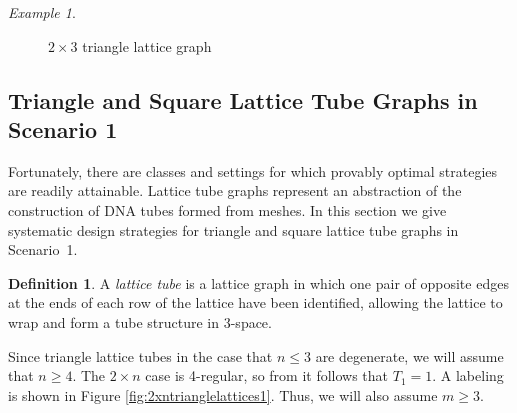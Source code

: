 \documentclass{elsarticle}
\theoremstyle{definition}
\newtheorem{definition}[theorem]{Definition}
\theoremstyle{remark}
\newtheorem{example}[theorem]{Example}
\theoremstyle{plain}
\theoremstyle{plain}
\begin{document}
\begin{example}
\begin{figure}[h]
 \caption{$2 \times 3$ triangle lattice graph}\label{TriangleNonIsoExample} \end{figure}

 \end{example}


\subsection{ Triangle and Square Lattice Tube Graphs in Scenario 1}\label{sec:tubes}
Fortunately, there are classes and settings for which provably optimal strategies are readily attainable.  Lattice tube graphs represent an abstraction of the construction of DNA tubes formed from meshes. In this section we give systematic design strategies for triangle and square lattice tube graphs in Scenario~1. 

\begin{definition} A \emph{lattice tube} is a lattice graph in which one pair of opposite edges at the ends of each row of the lattice have been identified, allowing the lattice to wrap and form a tube structure in 3-space. \end{definition} 
 
 Since triangle lattice tubes in the case that $n \leq 3$ are degenerate, we will assume that $n \geq 4$. The $2 \times n$ case is 4-regular, so from \cite{ellis2014minimal} it follows that $T_1 =1$. A labeling is shown in Figure \ref{fig:2xntrianglelattices1}. Thus, we will also assume $m \geq3$.  

\end{document}
